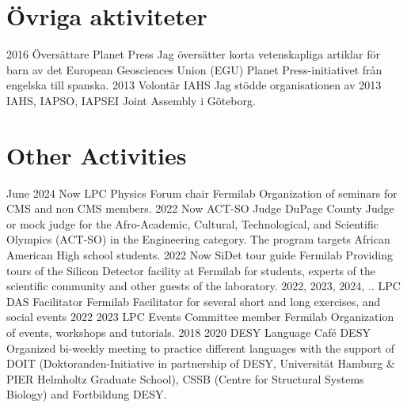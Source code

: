 \ifswedish
  \section{Övriga aktiviteter}
    \position
      {2016 \textemdash{}}
      {Översättare}
      {Planet Press}
      {Jag översätter korta vetenskapliga artiklar för barn av det European Geosciences Union (EGU) Planet Press-initiativet från engelska till spanska.}
    \position
      {2013}
      {Volontär}
      {IAHS}
      {Jag stödde organisationen av 2013 IAHS, IAPSO, IAPSEI Joint Assembly i Göteborg.}
\else
  \section{Other Activities}
     \position
      {June 2024 \textemdash{} Now} 
      {LPC Physics Forum chair}
      {Fermilab}
      {Organization of seminars for CMS and non CMS members.}
     \position
      {2022 \textemdash{} Now} 
      {ACT-SO Judge}
      {DuPage County}
      {Judge or mock judge for the Afro-Academic, Cultural, Technological, and Scientific Olympics (ACT-SO) in the Engineering category. The program targets African American High school students.}
     \position
      {2022 \textemdash{} Now} 
      {SiDet tour guide}
      {Fermilab}
      {Providing tours of the Silicon Detector facility at Fermilab for students, experts of the scientific community and other guests of the laboratory.}
      \position
      {2022, 2023, 2024, ..} 
      {LPC DAS Facilitator}
      {Fermilab}
      {Facilitator for several short and long exercises, and social events}
      \position
      {2022 \textemdash{} 2023} 
      {LPC Events Committee member}
      {Fermilab}
      {Organization of events, workshops and tutorials.}
    \position
      {2018 \textemdash{} 2020} 
      {DESY Language Café}
      {DESY}
      {Organized bi-weekly meeting to practice different languages with the support of DOIT (Doktoranden-Initiative in partnership of DESY, Universität Hamburg \&  PIER Helmholtz Graduate School), CSSB (Centre for Structural Systems Biology) and Fortbildung DESY.}
\fi
